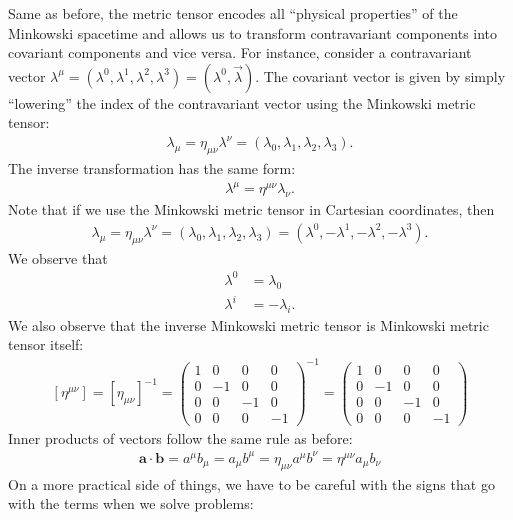\documentclass{article}
\theoremstyle{definition}
\begin{document}
Same as before, the metric tensor encodes all ``physical properties'' of the Minkowski spacetime and allows us to transform contravariant components into covariant components and vice versa. For instance, consider a contravariant vector $\lambda^\mu = (\lambda^0, \lambda^1, \lambda^2, \lambda^3) = (\lambda^0, \vec{\lambda})$. The covariant vector is given by simply ``lowering'' the index of the contravariant vector using the Minkowski metric tensor:
\begin{align*}
\lambda_\mu = \eta_{\mu\nu}\lambda^\nu = (\lambda_0, \lambda_1, \lambda_2, \lambda_3).
\end{align*}
The inverse transformation has the same form:
\begin{align*}
\lambda^\mu = \eta^{\mu\nu}\lambda_\nu.
\end{align*}
Note that if we use the Minkowski metric tensor in Cartesian coordinates, then
\begin{align*}
\lambda_\mu = \eta_{\mu\nu}\lambda^\nu = (\lambda_0, \lambda_1, \lambda_2, \lambda_3) = (\lambda^0, -\lambda^1, -\lambda^2, -\lambda^3).
\end{align*}
We observe that
\begin{align*}
\lambda^0 &= \lambda_0\\
\lambda^i &= -\lambda_i.
\end{align*}
We also observe that the inverse Minkowski metric tensor is Minkowski metric tensor itself:
\begin{align*}
\boxed{
[\eta^{\mu\nu}] = [\eta_{\mu\nu}]^{-1} 
= 
\begin{pmatrix}
1 & 0 & 0 & 0\\
0 & -1 & 0 & 0\\
0 & 0 & -1 & 0\\
0 & 0 & 0 & -1
\end{pmatrix}^{-1}
=
\begin{pmatrix}
1 & 0 & 0 & 0\\
0 & -1 & 0 & 0\\
0 & 0 & -1 & 0\\
0 & 0 & 0 & -1
\end{pmatrix}}
\end{align*}
Inner products of vectors follow the same rule as before:
\begin{align*}
\boxed{
\mathbf{a}\cdot\mathbf{b} = a^\mu b_\mu = a_\mu b^\mu = \eta_{\mu\nu}a^\mu b^\nu = \eta^{\mu\nu}a_\mu b_\nu}
\end{align*}
On a more practical side of things, we have to be careful with the signs that go with the terms when we solve problems:
\end{document}
